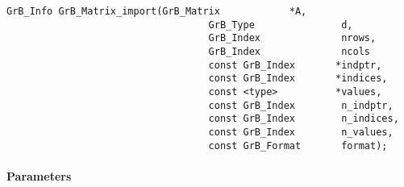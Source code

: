 \begin{Verbatim}[samepage=true]    
        GrB_Info GrB_Matrix_import(GrB_Matrix            *A,
                                   GrB_Type               d,
                                   GrB_Index              nrows,
                                   GrB_Index              ncols
                                   const GrB_Index       *indptr,
                                   const GrB_Index       *indices,
                                   const <type>          *values,
                                   const GrB_Index        n_indptr,
                                   const GrB_Index        n_indices,
                                   const GrB_Index        n_values,
                                   const GrB_Format       format);
\end{Verbatim}

\paragraph{Parameters}

